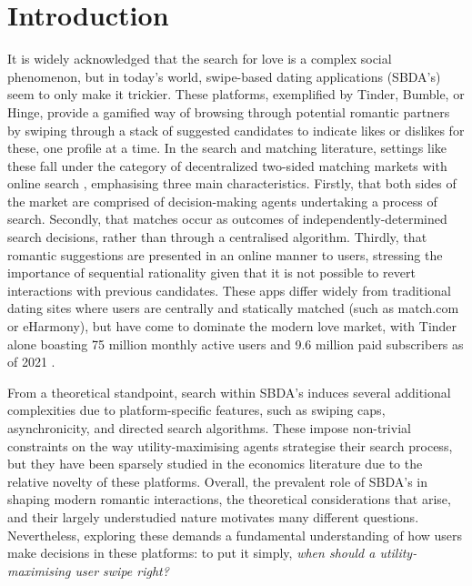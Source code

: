 \section{Introduction}
\label{sec:section1}
It is widely acknowledged that the search for love is a complex social phenomenon, but in today's world, swipe-based dating applications (SBDA's) seem to only make it trickier.
These platforms, exemplified by Tinder, Bumble, or Hinge, provide a gamified way of browsing through potential romantic partners by swiping through a stack of suggested candidates to indicate likes or dislikes for these, one profile at a time. 
In the search and matching literature, settings like these fall under the category of decentralized two-sided matching markets with online search \citep{kanoria2021facilitating}, emphasising three main characteristics.
Firstly, that both sides of the market are comprised of decision-making agents undertaking a process of search.
Secondly, that matches occur as outcomes of independently-determined search decisions, rather than through a centralised algorithm. Thirdly, that romantic suggestions are presented in an online manner to users, stressing the importance of sequential rationality given that it is not possible to revert interactions with previous candidates.
These apps differ widely from traditional dating sites where users are centrally and statically matched (such as match.com or eHarmony), but have come to dominate the modern love market, with Tinder alone boasting 75 million monthly active users and 9.6 million paid subscribers as of 2021 \citep{web:tinder_stats}.

From a theoretical standpoint, search within SBDA's induces several additional complexities due to platform-specific features, such as swiping caps, asynchronicity, and directed search algorithms.
These impose non-trivial constraints on the way utility-maximising agents strategise their search process, but they have been sparsely studied in the economics literature due to the relative novelty of these platforms.
Overall, the prevalent role of SBDA's in shaping modern romantic interactions, the theoretical considerations that arise, and their largely understudied nature motivates many different questions.
Nevertheless, exploring these demands a fundamental understanding of how users make decisions in these platforms: to put it simply, \textit{when should a utility-maximising user swipe right?}

